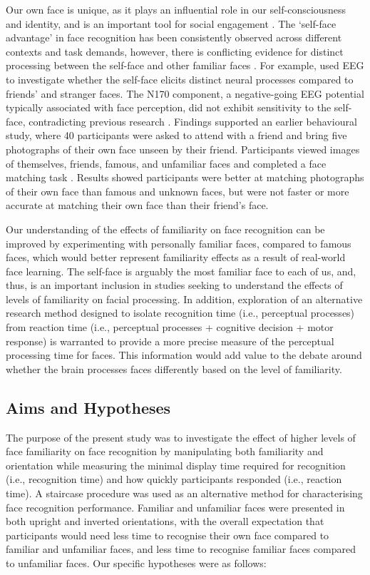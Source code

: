 \documentclass[
  authoryear,
  review,
  3p,
  onecolumn]{elsarticle}
\begin{document}
Our own face is unique, as it plays an influential role in our
self-consciousness and identity, and is an important tool for social
engagement \citep{bortolon2018a}. The `self-face advantage' in face
recognition has been consistently observed across different contexts and
task demands, however, there is conflicting evidence for distinct
processing between the self-face and other familiar faces
\citep{alzueta2019a, tong1999a, wiese2019a}. For example,
\citet{alzueta2019a} used EEG to investigate whether the self-face
elicits distinct neural processes compared to friends' and stranger
faces. The N170 component, a negative-going EEG potential typically
associated with face perception, did not exhibit sensitivity to the
self-face, contradicting previous research
\citep{caharel2021a, wiese2019a}. Findings supported an earlier
behavioural study, where 40 participants were asked to attend with a
friend and bring five photographs of their own face unseen by their
friend. Participants viewed images of themselves, friends, famous, and
unfamiliar faces and completed a face matching task
\citep{bortolon2017a}. Results showed participants were better at
matching photographs of their own face than famous and unknown faces,
but were not faster or more accurate at matching their own face than
their friend's face.

Our understanding of the effects of familiarity on face recognition can
be improved by experimenting with personally familiar faces, compared to
famous faces, which would better represent familiarity effects as a
result of real-world face learning. The self-face is arguably the most
familiar face to each of us, and, thus, is an important inclusion in
studies seeking to understand the effects of levels of familiarity on
facial processing. In addition, exploration of an alternative research
method designed to isolate recognition time (i.e., perceptual processes)
from reaction time (i.e., perceptual processes + cognitive decision +
motor response) is warranted to provide a more precise measure of the
perceptual processing time for faces. This information would add value
to the debate around whether the brain processes faces differently based
on the level of familiarity.

\subsection{Aims and Hypotheses}\label{aims-and-hypotheses}

The purpose of the present study was to investigate the effect of higher
levels of face familiarity on face recognition by manipulating both
familiarity and orientation while measuring the minimal display time
required for recognition (i.e., recognition time) and how quickly
participants responded (i.e., reaction time). A staircase procedure was
used as an alternative method for characterising face recognition
performance. Familiar and unfamiliar faces were presented in both
upright and inverted orientations, with the overall expectation that
participants would need less time to recognise their own face compared
to familiar and unfamiliar faces, and less time to recognise familiar
faces compared to unfamiliar faces. Our specific hypotheses were as
follows:
\end{document}
